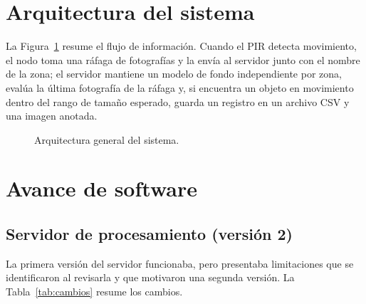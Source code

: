 \documentclass[11pt,a4paper]{article}
\begin{document}
\section{Arquitectura del sistema}

La Figura~\ref{fig:arq} resume el flujo de información. Cuando el PIR detecta movimiento, el nodo toma una ráfaga de fotografías y la envía al servidor junto con el nombre de la zona; el servidor mantiene un modelo de fondo independiente por zona, evalúa la última fotografía de la ráfaga y, si encuentra un objeto en movimiento dentro del rango de tamaño esperado, guarda un registro en un archivo CSV y una imagen anotada.

\begin{figure}[H]
\centering
{}
\caption{Arquitectura general del sistema.}
\label{fig:arq}
\end{figure}

\section{Avance de software}

\subsection{Servidor de procesamiento (versión 2)}

La primera versión del servidor funcionaba, pero presentaba limitaciones que se identificaron al revisarla y que motivaron una segunda versión. La Tabla~\ref{tab:cambios} resume los cambios.
\end{document}
